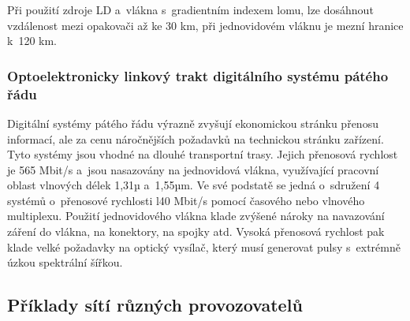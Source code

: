 Při použití zdroje LD a~vlákna s~gradientním indexem lomu, lze dosáhnout vzdálenost mezi opakovači až ke 30 km, při jednovidovém vláknu je mezní hranice k~120 km.

\subsubsection{Optoelektronicky linkový trakt digitálního systému pátého řádu}
Digitální systémy pátého řádu výrazně zvyšují ekonomickou stránku přenosu informací, ale za cenu náročnějších požadavků na technickou stránku zařízení. Tyto systémy jsou vhodné na dlouhé transportní trasy. Jejich přenosová rychlost je 565 Mbit/s a~jsou nasazovány na jednovidová vlákna, využívající pracovní oblast vlnových délek 1,31µ a~1,55µm. Ve své podstatě se jedná o~sdružení 4 systémů o~přenosové rychlosti l40 Mbit/s pomocí časového nebo vlnového multiplexu. Použití jednovidového vlákna klade zvýšené nároky na navazování záření do vlákna, na konektory, na spojky atd. Vysoká přenosová rychlost pak klade velké požadavky na optický vysílač, který musí generovat pulsy s~extrémně úzkou spektrální šířkou.

\subsection{Příklady sítí různých provozovatelů}



\clearpage
